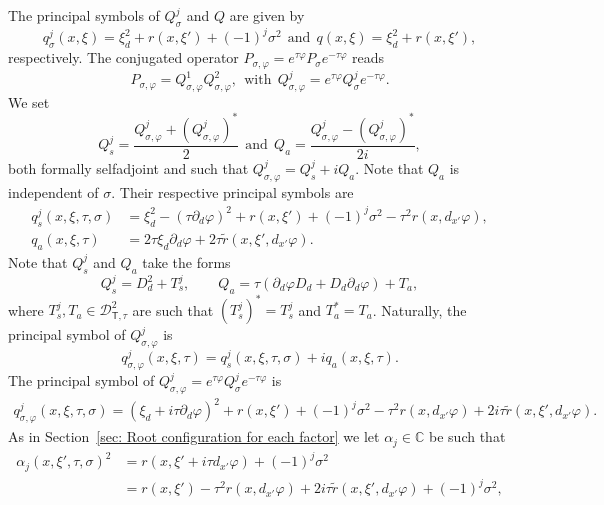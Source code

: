 \documentclass[JEP,XML,SOM,Unicode,published]{cedram}
\theoremstyle{plain}
\theoremstyle{definition}
\def\C{\mathbb{C}}
\newcommand{\Dsct}{\mathscr{D}_{{\scriptscriptstyle{\mathsf T}},\tau}}
\newcommand{\Psig}{P_{\sigma}}
\newcommand{\Qsig}{Q_{\sigma}}
\newcommand{\qsig}{q_{\sigma}}
\newcommand{\Pconj}{P_{\sigma,\varphi}}
\newcommand{\Qconj}{Q_{\sigma,\varphi}}
\newcommand{\qconj}{q_{\sigma,\varphi}}
\newcommand{\Qs}{Q_{s}}
\newcommand{\qs}{q_{s}}
\newcommand{\Qa}{Q_{a}}
\newcommand{\qa}{q_{a}}
\begin{document}
The principal symbols of $\Qsig^j$ and $Q$ are given by
\begin{equation}
\label{eq: symbols laplace operator}
\qsig^j (x,\xi)= \xi_d^2 + r(x,\xi') + (-1)^j \sigma^2
\ \ \text{and} \ \ q (x,\xi) = \xi_d^2 + r(x,\xi'),
\end{equation}
respectively.
The conjugated operator
$\Pconj=e^{\tau\varphi}\Psig e^{-\tau\varphi}$ reads
\begin{equation*}
\Pconj=\Qconj^1\Qconj^2,
\ \ \text{with}\ \
\Qconj^j=e^{\tau\varphi}\Qsig^je^{-\tau\varphi}.
\end{equation*}
We set
\begin{equation*}
\Qs^j=\frac{\Qconj^j+(\Qconj^j)^*}{2}
\ \ \text{and} \ \
\Qa=\frac{\Qconj^j-(\Qconj^j)^*}{2i},
\end{equation*}
both formally selfadjoint and such that
$\Qconj^j=\Qs^j+i\Qa$. Note that $\Qa$ is
independent of $\sigma$. Their respective
principal symbols
are
\begin{align*}
\qs^j(x,\xi,\tau,\sigma)&=\xi_d^2-(\tau\partial_d\varphi)^2+r(x,\xi')
+ (-1)^j\sigma^2-\tau^2r(x,d_{x'}\varphi),\\
\qa(x,\xi,\tau)&=2\tau\xi_d\partial_d\varphi+2\tau\tilde{r}(x,\xi',
d_{x'}\varphi).
\end{align*}
Note that $\Qs^j$ and $\Qa$ take the forms
\begin{equation}
\label{eq: form of Qs Qa}
\Qs^j = D_d^2 + T_s^j, \qquad
\Qa = \tau (\partial_d \varphi D_d
+ D_d \partial_d \varphi) + T_a,
\end{equation}
where $T_s^j, T_a \in \Dsct^2$ are such that $(T_s^j)^* = T_s^j$ and
$T_a^* = T_a$.
Naturally, the principal symbol of $\Qconj^j$ is
\begin{equation*}
\qconj^j(x,\xi,\tau)=\qs^j(x,\xi,\tau,\sigma)+i\qa(x,\xi,\tau).
\end{equation*}
The principal symbol of $\Qconj^j=e^{\tau\varphi}\Qsig^je^{-\tau\varphi}$ is
\begin{align*}
\qconj^j(x,\xi,\tau,\sigma)
=(\xi_d+i\tau\partial_d\varphi)^2+r(x,\xi')
+ (-1)^j\sigma^2-\tau^2r(x,d_{x'}\varphi)+2i\tau\tilde{r}(x,\xi',d_{x'}\varphi).
\end{align*}
As in Section~\ref{sec: Root configuration for each factor} we let $\alpha_j \in \C$ be such that
\begin{align*}
\alpha_j(x,\xi',\tau,\sigma)^2
&= r(x, \xi' + i \tau d_{x'}\varphi) + (-1)^j \sigma^2\\
&=r(x,\xi')
-\tau^2 r(x,d_{x'}\varphi)
+2i\tau\tilde{r}(x,\xi',d_{x'}\varphi)
+ (-1)^j \sigma^2,
\end{align*}
\end{document}
